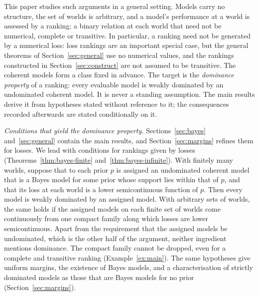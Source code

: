 \documentclass[11pt]{article}
\theoremstyle{definition}
\theoremstyle{remark}
\begin{document}
This paper studies such arguments in a general setting. Models carry no structure, the set of worlds is arbitrary, and a model's performance at a world is assessed by a ranking: a binary relation at each world that need not be numerical, complete or transitive. In particular, a ranking need not be generated by a numerical loss: loss rankings are an important special case, but the general theorems of Section~\ref{sec:general} use no numerical values, and the rankings constructed in Section~\ref{sec:construct} are not assumed to be transitive. The coherent models form a class fixed in advance. The target is the \emph{dominance property} of a ranking: every evaluable model is weakly dominated by an undominated coherent model. It is never a standing assumption. The main results derive it from hypotheses stated without reference to it; the consequences recorded afterwards are stated conditionally on it.

\emph{Conditions that yield the dominance property.} Sections~\ref{sec:bayes} and~\ref{sec:general} contain the main results, and Section~\ref{sec:margins} refines them for losses. We lead with conditions for rankings given by losses (Theorems~\ref{thm:bayes-finite} and~\ref{thm:bayes-infinite}). With finitely many worlds, suppose that to each prior $p$ is assigned an undominated coherent model that is a Bayes model for some prior whose support lies within that of $p$, and that its loss at each world is a lower semicontinuous function of $p$. Then every model is weakly dominated by an assigned model. With arbitrary sets of worlds, the same holds if the assigned models on each finite set of worlds come continuously from one compact family along which losses are lower semicontinuous. Apart from the requirement that the assigned models be undominated, which is the other half of the argument, neither ingredient mentions dominance. The compact family cannot be dropped, even for a complete and transitive ranking (Example~\ref{ex:main}). The same hypotheses give uniform margins, the existence of Bayes models, and a characterisation of strictly dominated models as those that are Bayes models for no prior (Section~\ref{sec:margins}).
\end{document}
